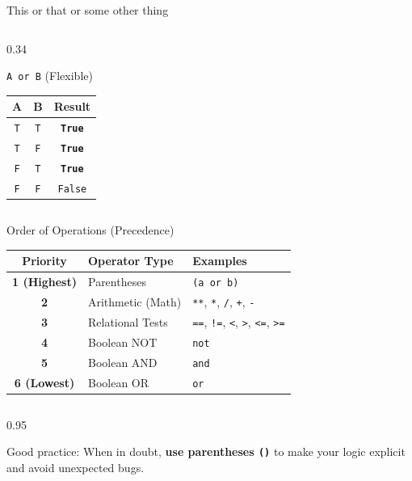 \documentclass[aspectratio=169,11pt,english]{beamer}
\begin{document}
\begin{frame}{ This or that or some other thing}
\begin{columns}[t]
			\begin{column}{0.34\textwidth}
				\begin{block}{\texttt{A or B} (Flexible)}
					\centering
					\renewcommand{\arraystretch}{1.1}
					\begin{tabular}{|c|c|c|}
						\hline
						\textbf{A} & \textbf{B} & \textbf{Result} \\ \hline
						\texttt{T} & \texttt{T} & \textbf{\texttt{True}} \\ \hline
						\texttt{T} & \texttt{F} & \textbf{\texttt{True}} \\ \hline
						\texttt{F} & \texttt{T} & \textbf{\texttt{True}} \\ \hline
						\texttt{F} & \texttt{F} & \texttt{False} \\ \hline
					\end{tabular}
					\vspace{0.15cm}
				\end{block}
			\end{column}
		\end{columns}
	\end{frame}
	\begin{frame}{Order of Operations (Precedence)}

		
		\centering
		\renewcommand{\arraystretch}{1.2}
		\begin{tabular}{|c|l|l|}
			\hline
			\textbf{Priority} & \textbf{Operator Type} & \textbf{Examples} \\ \hline
			\textbf{1 (Highest)} & Parentheses & \texttt{(a or b)} \\ \hline
			\textbf{2} & Arithmetic (Math) & \texttt{**}, \texttt{*}, \texttt{/}, \texttt{+}, \texttt{-} \\ \hline
			\textbf{3} & Relational Tests & \texttt{==}, \texttt{!=}, \texttt{<}, \texttt{>}, \texttt{<=}, \texttt{>=} \\ \hline
			\textbf{4} & Boolean NOT & \texttt{not} \\ \hline
			\textbf{5} & Boolean AND & \texttt{and} \\ \hline
			\textbf{6 (Lowest)} & Boolean OR & \texttt{or} \\ \hline
		\end{tabular}
		
		\vspace{0.3cm}
		\begin{columns}[t]
			\begin{column}{0.95\textwidth}
				\begin{block}{Good practice:}
					\footnotesize When in doubt, \textbf{use parentheses \texttt{()}} to make your logic explicit and avoid unexpected bugs.
				\end{block}
			\end{column}
		\end{columns}
	\end{frame}
\end{document}
